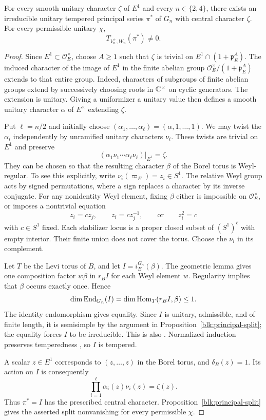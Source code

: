 \begin{lemma}
\label{blk:prescribed-center}
\label{blk:principal}
For every smooth unitary character $\zeta$ of $E^1$ and every
$n\in\{2,4\}$, there exists an irreducible unitary tempered principal
series $\pi^*$ of $G_n$ with central character $\zeta$.  For every
permissible unitary $\chi$,
\[
 T_{V_n^+,W_n}(\pi^*)\ne0.
\]
\end{lemma}

\begin{proof}
Since $E^1\subset\mathcal O_E^\times$, choose $A\ge1$ such that
$\zeta$ is trivial on $E^1\cap(1+\mathfrak p_E^A)$.  The induced
character of the image of $E^1$ in the finite abelian group
$\mathcal O_E^\times/(1+\mathfrak p_E^A)$ extends to that entire group.
Indeed, characters of subgroups of finite abelian groups extend by
successively choosing roots in $\mathbb C^\times$ on cyclic generators.
The extension is unitary.  Giving a uniformizer a unitary value then
defines a smooth unitary character $\alpha$ of $E^\times$ extending
$\zeta$.

Put $\ell=n/2$ and initially choose
$(\alpha_1,\ldots,\alpha_\ell)=(\alpha,1,\ldots,1)$. We may twist
the $\alpha_i$ independently by unramified unitary characters $\nu_i$.
These twists are trivial on $E^1$ and preserve
\[
 (\alpha_1\nu_1\cdots\alpha_\ell\nu_\ell)|_{E^1}=\zeta.
\]
They can be chosen so that the resulting character $\beta$ of the
Borel torus is Weyl-regular.  To see this explicitly, write
$\nu_i(\varpi_E)=z_i\in S^1$.  The relative Weyl group acts by signed
permutations, where a sign replaces a character by its inverse
conjugate.  For any nonidentity Weyl element, fixing $\beta$ either is
impossible on $\mathcal O_E^\times$, or imposes a nontrivial equation
\[
 z_i=c z_j,\qquad z_i=c z_j^{-1},\qquad\text{or}\qquad z_i^2=c
\]
with $c\in S^1$ fixed.  Each stabilizer locus is a proper closed subset
of $(S^1)^\ell$ with empty interior.  Their finite union does not cover
the torus.  Choose the $\nu_i$ in its complement.

Let $T$ be the Levi torus of $B$, and let $I=i_B^{G_n}(\beta)$.
The geometric lemma gives one composition
factor $w\beta$ in $r_BI$ for each Weyl element $w$.  Regularity implies
that $\beta$ occurs exactly once.  Hence
\[
 \dim\operatorname{End}_{G_n}(I)
   =\dim\operatorname{Hom}_T(r_BI,\beta)\le1.
\]
The identity endomorphism gives equality.  Since $I$ is unitary,
admissible, and of finite length, it is semisimple by the argument in
Proposition~\ref{blk:principal-split}; the equality forces $I$ to be
irreducible.  This is also
\cite[Theorem~6.6.1]{Casselman}.  Normalized induction preserves
temperedness \cite[Lemma~III.2.3]{Waldspurger03}, so $I$ is tempered.

A scalar $z\in E^1$ corresponds to $(z,\ldots,z)$ in the Borel torus,
and $\delta_B(z)=1$.  Its action on $I$ is consequently
\[
 \prod_{i=1}^{\ell}\alpha_i(z)\nu_i(z)=\zeta(z).
\]
Thus $\pi^*=I$ has the prescribed central character.
Proposition~\ref{blk:principal-split} gives the asserted split
nonvanishing for every permissible $\chi$.
\end{proof}

